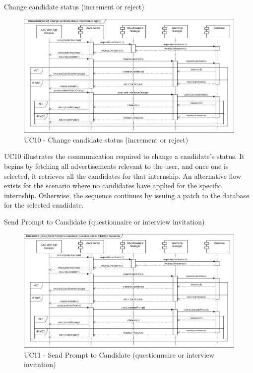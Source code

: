 \begin{enumerate}[label={[UC\arabic*]}]
    \item Change candidate status (increment or reject)
    \begin{figure}[h]
        \centering
        \includegraphics[width=1\linewidth]{DD-Latex//assets//Runtime View Diagrams/UC10.jpg}
        \caption{UC10 - Change candidate status (increment or reject)}
        \label{fig:UC10}
    \end{figure}

    UC10 illustrates the communication required to change a candidate's status. It begins by fetching all advertisements relevant to the user, and once one is selected, it retrieves all the candidates for that internship. An alternative flow exists for the scenario where no candidates have applied for the specific internship. Otherwise, the sequence continues by issuing a patch to the database for the selected candidate.

    \newpage
    \item Send Prompt to Candidate (questionnaire or interview invitation)

     \begin{figure}[h]
        \centering
        \includegraphics[width=1\linewidth]{DD-Latex//assets//Runtime View Diagrams/UC11.jpg}
        \caption{UC11 - Send Prompt to Candidate (questionnaire or interview invitation)}
        \label{fig:UC11}
    \end{figure}


\end{enumerate}
